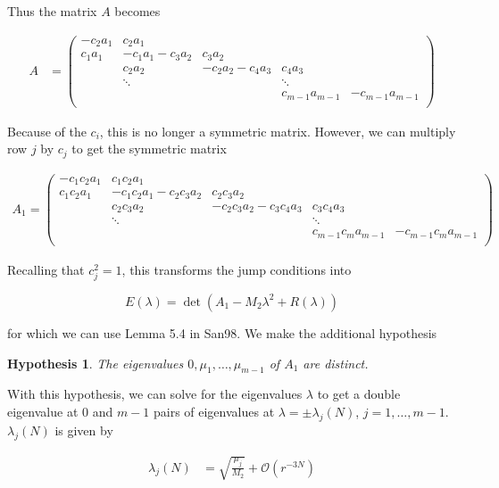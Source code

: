 \documentclass[12pt]{article}
\newtheorem{hypothesis}{Hypothesis}
\begin{document}
Thus the matrix $A$ becomes

\begin{align*}
A &= \begin{pmatrix}
-c_2 a_1 & c_2 a_1 & & &  \\
c_1 a_1 & -c_1 a_1 - c_3 a_2 & c_3 a_2 \\
& c_2 a_2 & -c_2 a_2 - c_4 a_3 & c_4 a_3 \\
& \ddots & & \ddots \\
& & & c_{m-1} a_{m-1} & -c_{m-1} a_{m-1}  \\
\end{pmatrix}
\end{align*}

Because of the $c_i$, this is no longer a symmetric matrix. However, we can multiply row $j$ by $c_j$ to get the symmetric matrix

\begin{align*}
A_1 = 
\begin{pmatrix}
-c_1 c_2 a_1 & c_1 c_2 a_1 & & &  \\
c_1 c_2 a_1 & -c_1 c_2 a_1 - c_2 c_3 a_2 & c_2 c_3 a_2 \\
& c_2 c_3 a_2 & -c_2 c_3 a_2 - c_3 c_4 a_3  & c_3 c_4 a_3 \\
& \ddots & & \ddots \\
& & & c_{m-1} c_m a_{m-1} & -c_{m-1} c_m a_{m-1} \\
\end{pmatrix}
\end{align*}

Recalling that $c_j^2 = 1$, this transforms the jump conditions into

\[
E(\lambda) = 
\det(A_1 - M_2 \lambda^2 + R(\lambda) )
\]

for which we can use Lemma 5.4 in San98. We make the additional hypothesis

\begin{hypothesis}\label{A0distincteigs}
The eigenvalues $0, \mu_1, \dots, \mu_{m-1}$ of $A_1$ are distinct.
\end{hypothesis}

With this hypothesis, we can solve for the eigenvalues $\lambda$ to get a double eigenvalue at 0 and $m-1$ pairs of eigenvalues at $\lambda = \pm \lambda_j(N)$, $j = 1, \dots, m-1$. $\lambda_j(N)$ is given by

\begin{align*}
\lambda_j(N) &= \sqrt{\frac{\mu_j}{M_2}} + \mathcal{O}(r^{-3N}) 
\end{align*}
\end{document}
